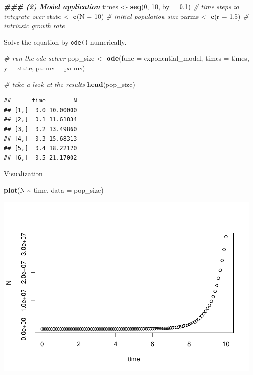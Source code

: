 \documentclass[
]{book}
\newenvironment{Shaded}{\begin{snugshade}}{\end{snugshade}}
\newcommand{\AttributeTok}[1]{\textcolor[rgb]{0.13,0.29,0.53}{#1}}
\newcommand{\CommentTok}[1]{\textcolor[rgb]{0.56,0.35,0.01}{\textit{#1}}}
\newcommand{\DecValTok}[1]{\textcolor[rgb]{0.00,0.00,0.81}{#1}}
\newcommand{\DocumentationTok}[1]{\textcolor[rgb]{0.56,0.35,0.01}{\textbf{\textit{#1}}}}
\newcommand{\FloatTok}[1]{\textcolor[rgb]{0.00,0.00,0.81}{#1}}
\newcommand{\FunctionTok}[1]{\textcolor[rgb]{0.13,0.29,0.53}{\textbf{#1}}}
\newcommand{\NormalTok}[1]{#1}
\newcommand{\OtherTok}[1]{\textcolor[rgb]{0.56,0.35,0.01}{#1}}
\newcommand{\SpecialCharTok}[1]{\textcolor[rgb]{0.81,0.36,0.00}{\textbf{#1}}}
\begin{document}
\begin{Shaded}
\begin{Highlighting}[]
\DocumentationTok{\#\#\# (2) Model application}
\NormalTok{times }\OtherTok{\textless{}{-}} \FunctionTok{seq}\NormalTok{(}\DecValTok{0}\NormalTok{, }\DecValTok{10}\NormalTok{, }\AttributeTok{by =} \FloatTok{0.1}\NormalTok{)  }\CommentTok{\# time steps to integrate over}
\NormalTok{state }\OtherTok{\textless{}{-}} \FunctionTok{c}\NormalTok{(}\AttributeTok{N =} \DecValTok{10}\NormalTok{)  }\CommentTok{\# initial population size}
\NormalTok{parms }\OtherTok{\textless{}{-}} \FunctionTok{c}\NormalTok{(}\AttributeTok{r =} \FloatTok{1.5}\NormalTok{)  }\CommentTok{\# intrinsic growth rate}
\end{Highlighting}
\end{Shaded}

Solve the equation by \texttt{ode()} numerically.

\begin{Shaded}
\begin{Highlighting}[]
\CommentTok{\# run the ode solver}
\NormalTok{pop\_size }\OtherTok{\textless{}{-}} \FunctionTok{ode}\NormalTok{(}\AttributeTok{func =}\NormalTok{ exponential\_model, }\AttributeTok{times =}\NormalTok{ times, }\AttributeTok{y =}\NormalTok{ state, }\AttributeTok{parms =}\NormalTok{ parms)}

\CommentTok{\# take a look at the results}
\FunctionTok{head}\NormalTok{(pop\_size)}
\end{Highlighting}
\end{Shaded}

\begin{verbatim}
##      time        N
## [1,]  0.0 10.00000
## [2,]  0.1 11.61834
## [3,]  0.2 13.49860
## [4,]  0.3 15.68313
## [5,]  0.4 18.22120
## [6,]  0.5 21.17002
\end{verbatim}

Visualization

\begin{Shaded}
\begin{Highlighting}[]
\FunctionTok{plot}\NormalTok{(N }\SpecialCharTok{\textasciitilde{}}\NormalTok{ time, }\AttributeTok{data =}\NormalTok{ pop\_size)}
\end{Highlighting}
\end{Shaded}

\includegraphics{bookdown-demo_files/figure-latex/unnamed-chunk-5-1.pdf}
\end{document}
